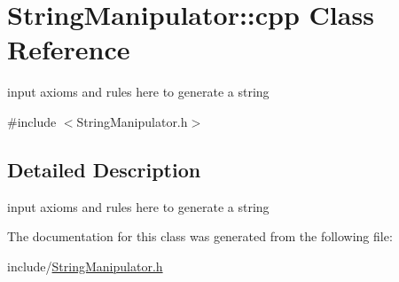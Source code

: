 \hypertarget{classStringManipulator_1_1cpp}{
\section{StringManipulator::cpp Class Reference}
\label{classStringManipulator_1_1cpp}
}


input axioms and rules here to generate a string  


{\ttfamily \#include $<$StringManipulator.h$>$}

\subsection{Detailed Description}
input axioms and rules here to generate a string 

The documentation for this class was generated from the following file:\begin{DoxyCompactItemize}
\item 
include/\hyperlink{StringManipulator_8h}{StringManipulator.h}\end{DoxyCompactItemize}
